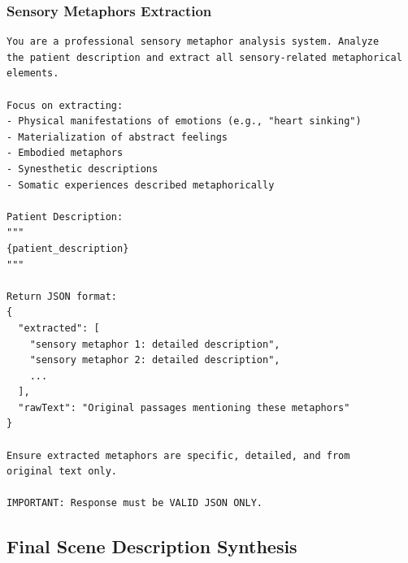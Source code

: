 \documentclass[sigconf,review,anonymous]{acmart}
\begin{document}
\subsubsection{Sensory Metaphors Extraction}

\begin{lstlisting}
You are a professional sensory metaphor analysis system. Analyze 
the patient description and extract all sensory-related metaphorical 
elements.

Focus on extracting:
- Physical manifestations of emotions (e.g., "heart sinking")
- Materialization of abstract feelings
- Embodied metaphors
- Synesthetic descriptions
- Somatic experiences described metaphorically

Patient Description:
"""
{patient_description}
"""

Return JSON format:
{
  "extracted": [
    "sensory metaphor 1: detailed description",
    "sensory metaphor 2: detailed description",
    ...
  ],
  "rawText": "Original passages mentioning these metaphors"
}

Ensure extracted metaphors are specific, detailed, and from 
original text only.

IMPORTANT: Response must be VALID JSON ONLY.
\end{lstlisting}

\subsection{Final Scene Description Synthesis}
\end{document}
